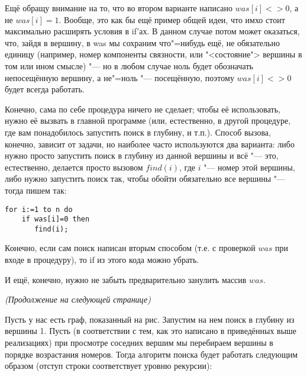 Ещё обращу внимание на то, что во втором варианте написано $was[i]<>0$, а не $was[i]=1$. Вообще, 
это как бы ещё пример общей идеи, что имхо стоит максимально расширять условия в if'ах. В данном 
случае потом может оказаться, что, зайдя в вершину, в was мы сохраним что"=нибудь ещё, не 
обязательно единицу (например, номер компоненты связности, или "<состояние"> вершины в том или ином 
смысле) "--- но в любом случае ноль будет обозначать непосещённую вершину, а не"=ноль "--- 
посещённую, поэтому $was[i]<>0$ будет всегда работать.

\label{howtocall}
Конечно, сама по себе процедура ничего не сделает; чтобы её 
использовать, нужно её вызвать в главной программе (или, естественно, в другой процедуре, где вам 
понадобилось запустить поиск в глубину, и т.п.). Способ вызова, конечно, зависит от задачи, но 
наиболее часто используются два варианта: либо нужно просто запустить поиск в глубину из данной 
вершины и всё "--- это, естественно, делается просто вызовом $find(i)$, где $i$ "--- номер этой 
вершины, либо нужно запустить поиск так, чтобы обойти обязательно все вершины "--- тогда пишем так:
\begin{codesampleo}\begin{verbatim}
for i:=1 to n do
    if was[i]=0 then
       find(i);
\end{verbatim}\end{codesampleo}
Конечно, если сам поиск написан вторым способом (т.е. с проверкой $was$ при входе в процедуру), то 
if из этого кода можно убрать.

И ещё, конечно, нужно не забыть предварительно занулить массив $was$.


\vspace{3cm}

\textit{(Продолжение на следующей странице)}

\eject
{}
Пусть у нас есть граф, показанный на рис. Запустим на нем поиск в глубину из вершины 1. Пусть (в 
соответствии с тем, как это написано в приведённых выше реализациях) при  
просмотре соседних вершим мы перебираем вершины в порядке возрастания номеров. Тогда алгоритм 
поиска будет работать следующим образом (отступ строки соответствует уровню рекурсии):

